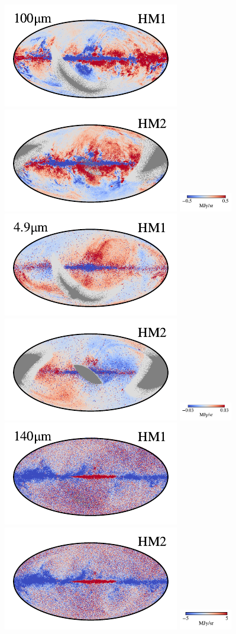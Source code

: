 \documentclass[twocolumn]{aa}
\begin{document}
\begin{figure}[t]
    \includegraphics[width=0.22\linewidth]{figs/compare_res/cosmoglobe_res_08a.pdf}%
    \includegraphics[width=0.22\linewidth]{figs/compare_res/cosmoglobe_res_08b.pdf}%
    \includegraphics[width=23mm,angle=90]{figs/compare_res/cbar_08.pdf}\\
    \includegraphics[width=0.22\linewidth]{figs/compare_res/cosmoglobe_res_04a.pdf}%
    \includegraphics[width=0.22\linewidth]{figs/compare_res/cosmoglobe_res_04b.pdf}%
    \includegraphics[width=23mm,angle=90]{figs/compare_res/cbar_04.pdf}\hspace*{3mm}
    \includegraphics[width=0.22\linewidth]{figs/compare_res/cosmoglobe_res_09a.pdf}%
    \includegraphics[width=0.22\linewidth]{figs/compare_res/cosmoglobe_res_09b.pdf}%
    \includegraphics[width=23mm,angle=90]{figs/compare_res/cbar_09.pdf}\\

\end{figure}
\end{document}
